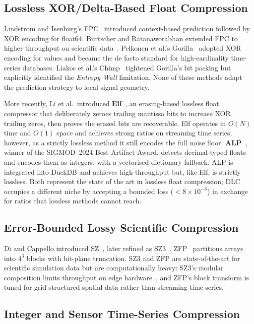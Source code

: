 \documentclass[runningheads]{llncs}
\begin{document}
\subsection{Lossless XOR/Delta-Based Float Compression}

Lindstrom and Isenburg's FPC~\cite{fpc2006} introduced context-based prediction followed by XOR encoding for float64. Burtscher and Ratanaworabhan extended FPC to higher throughput on scientific data~\cite{fpc_extended2009}. Pelkonen et al.'s Gorilla~\cite{gorilla2015} adopted XOR encoding for values and became the de facto standard for high-cardinality time-series databases. Liakos et al.'s Chimp~\cite{chimp2022} tightened Gorilla's bit packing but explicitly identified the \emph{Entropy Wall} limitation. None of these methods adapt the prediction strategy to local signal geometry.

More recently, Li et al.\ introduced \textbf{Elf}~\cite{elf2023}, an erasing-based lossless float compressor that deliberately zeroes trailing mantissa bits to increase XOR trailing zeros, then proves the erased bits are recoverable. Elf operates in $O(N)$ time and $O(1)$ space and achieves strong ratios on streaming time series; however, as a strictly lossless method it still encodes the full noise floor. \textbf{ALP}~\cite{alp2024}, winner of the SIGMOD~2024 Best Artifact Award, detects decimal-typed floats and encodes them as integers, with a vectorised dictionary fallback. ALP is integrated into DuckDB and achieves high throughput but, like Elf, is strictly lossless. Both represent the state of the art in lossless float compression; DLC occupies a different niche by accepting a bounded loss ($< 8 \times 10^{-6}$) in exchange for ratios that lossless methods cannot reach.

\subsection{Error-Bounded Lossy Scientific Compression}

Di and Cappello introduced SZ~\cite{sz2016}, later refined as SZ3~\cite{sz3_2023}. ZFP~\cite{zfp2014} partitions arrays into $4^3$ blocks with bit-plane truncation. SZ3 and ZFP are state-of-the-art for scientific simulation data but are computationally heavy: SZ3's modular composition limits throughput on edge hardware~\cite{sprintz2018}, and ZFP's block transform is tuned for grid-structured spatial data rather than streaming time series.

\subsection{Integer and Sensor Time-Series Compression}
\end{document}
